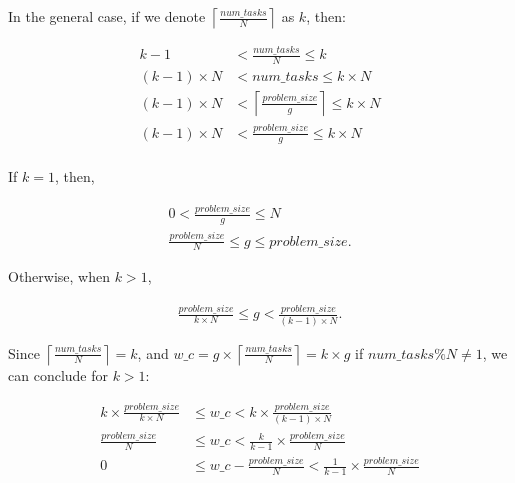 In the general case, if we denote $\left \lceil{\frac{num\_{tasks}}{N}}\right \rceil$ as $k$, then:


\begin{equation}\label{formula8}
\begin{aligned}
k-1&<{\frac{num\_{tasks}}{N}}\leq{k}\\
(k-1)\times{N}&<num\_{tasks}\leq{k}\times{N}\\
(k-1)\times{N}&<\left \lceil{\frac{problem\_{size}}{g}}\right \rceil\leq{k}\times{N}\\
(k-1)\times{N}&<\frac{problem\_{size}}{g}\leq{{k}\times{N}}\\
\end{aligned}
\end{equation}

If $k=1$, then, 

\begin{equation}\label{formula9}
\begin{aligned}
0<\frac{problem\_{size}}{g}\leq{N}\\
\frac{problem\_{size}}{N}\leq{g}\leq{problem\_{size}}.
\end{aligned}
\end{equation}

Otherwise, when $k>1$,

\begin{equation}\label{formula10}
\begin{aligned}
\frac{problem\_{size}}{k\times{N}}\leq{g}<\frac{problem\_{size}}{(k-1)\times{N}}.
\end{aligned}
\end{equation}

Since $\left \lceil{\frac{num\_{tasks}}{N}}\right \rceil=k$, and $w\_c={g\times\left \lceil{\frac{num\_{tasks}}{N}}\right \rceil}={k\times{g}}$ if $num\_{tasks}\%{N}\neq{1}$, we can conclude for $k>1$:

\begin{equation}\label{formula11}
\begin{aligned}
k\times{\frac{problem\_{size}}{k\times{N}}}&\leq{w\_c}<{k\times{\frac{problem\_{size}}{(k-1)\times{N}}}}\\
\frac{problem\_{size}}{{N}}&\leq{w\_c}<{\frac{k}{k-1}\times{\frac{problem\_{size}}{N}}}\\
0&\leq{w\_c-\frac{problem\_{size}}{N}}<\frac{1}{k-1}\times{\frac{problem\_{size}}{N}}
\end{aligned}
\end{equation}

